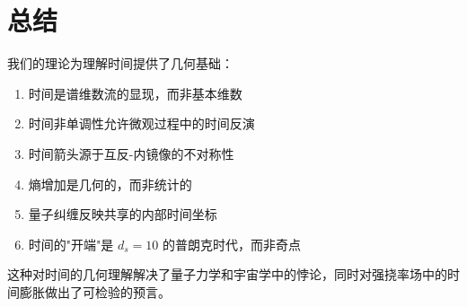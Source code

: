 \section{总结}

我们的理论为理解时间提供了几何基础：
\begin{enumerate}
    \item 时间是谱维数流的显现，而非基本维数
    \item 时间非单调性允许微观过程中的时间反演
    \item 时间箭头源于互反-内镜像的不对称性
    \item 熵增加是几何的，而非统计的
    \item 量子纠缠反映共享的内部时间坐标
    \item 时间的"开端"是 $d_s = 10$ 的普朗克时代，而非奇点
\end{enumerate}

这种对时间的几何理解解决了量子力学和宇宙学中的悖论，同时对强挠率场中的时间膨胀做出了可检验的预言。

